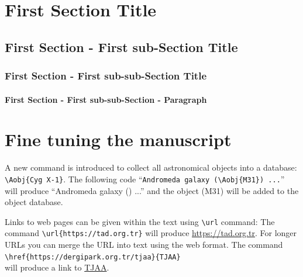 \documentclass[usenatbib]{tjaa}
\begin{document}
\section{First Section Title}

\lipsum[1]

\subsection{First Section - First sub-Section Title}

\lipsum[1]

\subsubsection{First Section - First sub-sub-Section Title}

\lipsum[1]

\paragraph{First Section - First sub-sub-Section - Paragraph}

\lipsum[1]

\newpage
\section{Fine tuning the manuscript}

A new command is introduced to collect all astronomical objects into a
database:
\verb|\Aobj{Cyg X-1}|.
The following code
``\verb|Andromeda galaxy (\Aobj{M31}) ...|''
will produce
``Andromeda galaxy () ...''
and the object (M31) will be added to the object database.

Links to web pages can be given within the text using \verb|\url| command:
The command \verb|\url{https://tad.org.tr}| will produce
\url{https://tad.org.tr}.
For longer URLs you can merge the URL into text using the web format.
The command
\verb|\href{https://dergipark.org.tr/tjaa}{TJAA}|\\
will produce a link to \href{https://dergipark.org.tr/tjaa}{TJAA}.
\end{document}
